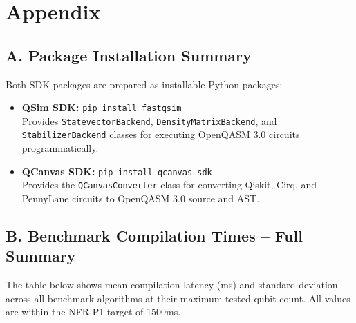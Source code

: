 \chapter*{Appendix}

\section*{A. Package Installation Summary}

Both SDK packages are prepared as installable Python packages:
\begin{itemize}
    \item \textbf{QSim SDK:} \texttt{pip install fastqsim} \\
    Provides \texttt{StatevectorBackend}, \texttt{DensityMatrixBackend}, and \texttt{StabilizerBackend} classes for executing OpenQASM 3.0 circuits programmatically.
    \item \textbf{QCanvas SDK:} \texttt{pip install qcanvas-sdk} \\
    Provides the \texttt{QCanvas\-Converter} class for converting Qiskit, Cirq, and PennyLane circuits to OpenQASM 3.0 source and AST.
\end{itemize}

\section*{B. Benchmark Compilation Times -- Full Summary}

The table below shows mean compilation latency (ms) and standard deviation across all benchmark algorithms at their maximum tested qubit count. All values are within the NFR-P1 target of 1500ms.

